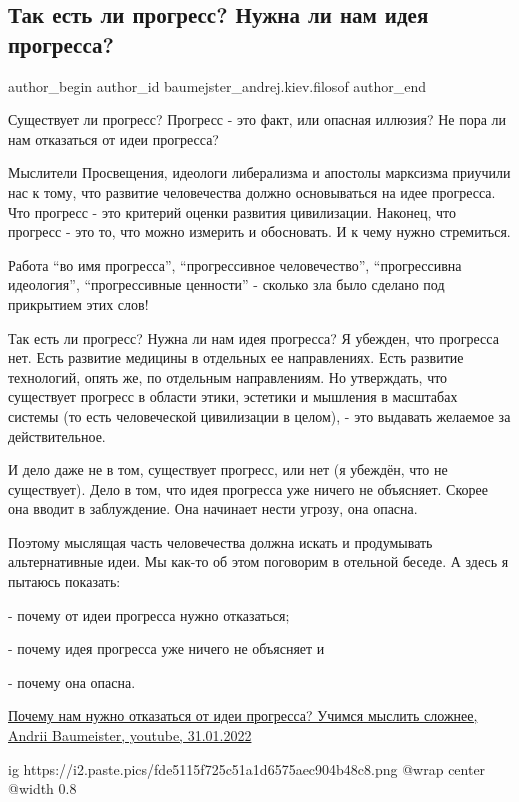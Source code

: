  
 
 
 
 
 
\subsection{Так есть ли прогресс? Нужна ли нам идея прогресса?}
\label{sec:31_01_2022.fb.baumejster_andrej.kiev.filosof.1.progress}
 
\ifcmt
 author_begin
   author_id baumejster_andrej.kiev.filosof
 author_end
\fi

Существует ли прогресс? Прогресс - это факт, или опасная иллюзия? Не пора ли
нам отказаться от идеи прогресса? 

Мыслители Просвещения, идеологи либерализма и апостолы марксизма приучили нас к
тому, что развитие человечества должно основываться на идее прогресса. Что
прогресс - это критерий оценки развития цивилизации. Наконец, что прогресс -
это то, что можно измерить и обосновать. И к чему нужно стремиться.

Работа \enquote{во имя прогресса}, \enquote{прогрессивное человечество},
\enquote{прогрессивна идеология}, \enquote{прогрессивные ценности} - сколько
зла было сделано под прикрытием этих слов! 

Так есть ли прогресс? Нужна ли нам идея прогресса? Я убежден, что прогресса
нет. Есть развитие медицины в отдельных ее направлениях. Есть развитие
технологий, опять же, по отдельным направлениям. Но утверждать, что существует
прогресс в области этики, эстетики и мышления в масштабах системы (то есть
человеческой цивилизации в целом), - это выдавать желаемое за действительное.

И дело даже не в том, существует прогресс, или нет (я убеждён, что не
существует). Дело в том, что идея прогресса уже ничего не объясняет. Скорее она
вводит в заблуждение. Она начинает нести угрозу, она опасна.

Поэтому мыслящая часть человечества должна искать и продумывать альтернативные
идеи. Мы как-то об этом поговорим в отельной беседе. А здесь я пытаюсь
показать:

- почему от идеи прогресса нужно отказаться;

- почему идея прогресса уже ничего не объясняет и

- почему она опасна.

\href{https://www.youtube.com/watch?v=jER8tOk0-qU}{%
Почему нам нужно отказаться от идеи прогресса? Учимся мыслить сложнее, %
Andrii Baumeister, youtube, 31.01.2022%
}

\ifcmt
  ig https://i2.paste.pics/fde5115f725c51a1d6575aec904b48c8.png
  @wrap center
  @width 0.8
\fi

